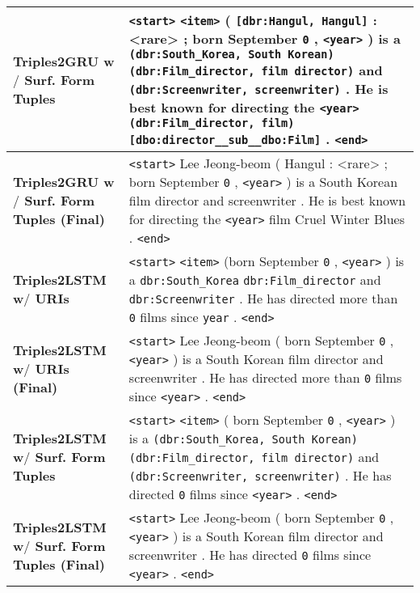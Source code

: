 \documentclass[preprint,5p]{elsarticle}
\begin{document}
\begin{table*}[h!]
\begin{center}
\begin{tabular}{|L{3.5cm}|L{14cm}|}
      
      \textbf{Triples2GRU w$/$  Surf. Form Tuples} & \texttt{<start>} \texttt{<item>} ( \texttt{[dbr:Hangul, Hangul]} : <rare> ; born September \texttt{0} , \texttt{<year>} ) is a \texttt{(dbr:South\_Korea, South Korean)} \texttt{(dbr:Film\_director, film director)} and \texttt{(dbr:Screenwriter, screenwriter)} . He is best known for directing the \texttt{<year>} \texttt{(dbr:Film\_director, film)} \texttt{[dbo:director\_\_sub\_\_dbo:Film]} . \texttt{<end>} \\ \hline

      \textbf{Triples2GRU w$/$ Surf. Form Tuples (Final)} & \texttt{<start>} Lee Jeong-beom ( Hangul : <rare> ; born September \texttt{0} , \texttt{<year>} ) is a South Korean film director and screenwriter . He is best known for directing the \texttt{<year>} film Cruel Winter Blues . \texttt{<end>} \\ \hline


      \textbf{Triples2LSTM w$/$ URIs} &  \texttt{<start>} \texttt{<item>} (born September \texttt{0} , \texttt{<year>} ) is a \texttt{dbr:South\_Korea} \texttt{dbr:Film\_director} and \texttt{dbr:Screenwriter} . He has directed more than \texttt{0} films since \texttt{year} . \texttt{<end>} \\ \hline
      
      \textbf{Triples2LSTM w$/$ URIs (Final)} & \texttt{<start>} Lee Jeong-beom ( born September \texttt{0} , \texttt{<year>} ) is a South Korean film director and screenwriter . He has directed more than \texttt{0} films since \texttt{<year>} . \texttt{<end>} \\ \hline
      
      
      \textbf{Triples2LSTM w$/$ Surf. Form Tuples} & \texttt{<start>} \texttt{<item>} ( born September \texttt{0} , \texttt{<year>} ) is a \texttt{(dbr:South\_Korea, South Korean)} \texttt{(dbr:Film\_director, film director)} and \texttt{(dbr:Screenwriter, screenwriter)} . He has directed \texttt{0} films since \texttt{<year>} . \texttt{<end>} \\ \hline

      \textbf{Triples2LSTM w$/$ Surf. Form Tuples (Final)} & \texttt{<start>} Lee Jeong-beom ( born September \texttt{0} , \texttt{<year>} ) is a South Korean film director and screenwriter . He has directed \texttt{0} films since \texttt{<year>} . \texttt{<end>} \\ \hline
      
      
    \end{tabular}
    
    \label{table:TextGenerationExamples}
  \end{center}
\end{table*}
\end{document}
